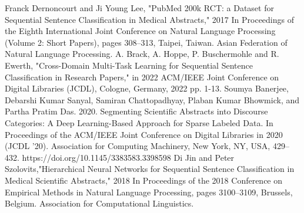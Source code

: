 \documentclass[12pt,a4paper]{report}     %
\begin{document}
\newpage
{}

\begin{normalsize}
				{\setlength{\baselineskip}{1.1\baselineskip}
{
\begin{thebibliography}{9}

 Franck Dernoncourt and Ji Young Lee, "PubMed 200k RCT: a Dataset for Sequential Sentence Classification in Medical Abstracts," 2017 In Proceedings of the Eighth International Joint Conference on Natural Language Processing (Volume 2: Short Papers), pages 308–313, Taipei, Taiwan. Asian Federation of Natural Language Processing.
 A. Brack, A. Hoppe, P. Buschermohle and R. Ewerth, "Cross-Domain Multi-Task Learning for Sequential Sentence Classification in Research Papers," in 2022 ACM/IEEE Joint Conference on Digital Libraries (JCDL), Cologne, Germany, 2022 pp. 1-13.
 Soumya Banerjee, Debarshi Kumar Sanyal, Samiran Chattopadhyay, Plaban Kumar Bhowmick, and Partha Pratim Das. 2020. Segmenting Scientific Abstracts into Discourse Categories: A Deep Learning-Based Approach for Sparse Labeled Data. In Proceedings of the ACM/IEEE Joint Conference on Digital Libraries in 2020 (JCDL '20). Association for Computing Machinery, New York, NY, USA, 429–432. https://doi.org/10.1145/3383583.3398598
 Di Jin and Peter Szolovits,"Hierarchical Neural Networks for Sequential Sentence Classification in Medical Scientific Abstracts," 2018 In Proceedings of the 2018 Conference on Empirical Methods in Natural Language Processing, pages 3100–3109, Brussels, Belgium. Association for Computational Linguistics.


\end{thebibliography}}}
\end{normalsize}
\end{document}
